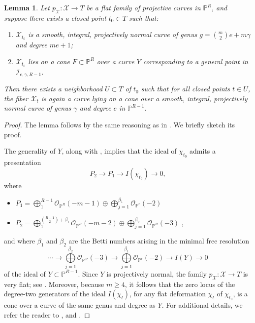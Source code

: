 \documentclass[a4paper,12pt]{amsart}
\newtheorem{lemma}[thm]{Lemma}
\begin{document}
\begin{lemma}\label{Sec5DeformLemma}
Let $p_{\mathcal{X}} : \mathcal{X} \to T$ be a flat family of projective curves in $\mathbb{P}^R$, and suppose there exists a closed point $t_0 \in T$ such that:
\begin{enumerate}[label=(\roman*), leftmargin=*, font=\rmfamily]
 \item  $\mathcal{X}_{t_0}$ is a smooth, integral, projectively normal curve of genus $g = \binom{m}{2}e + m\gamma$ and degree $me + 1$;

 \item $\mathcal{X}_{t_0}$ lies on a cone $F \subset \mathbb{P}^R$ over a curve $Y$ corresponding to a general point in $\mathcal{I}_{e, \gamma, R-1}$.
\end{enumerate}
Then there exists a neighborhood $U \subset T$ of $t_0$ such that for all closed points $t \in U$, the fiber $\mathcal{X}_t$ is again a curve lying on a cone over a smooth, integral, projectively normal curve of genus $\gamma$ and degree $e$ in $\mathbb{P}^{R-1}$.
\end{lemma}
\begin{proof}
The lemma follows by the same reasoning as in \cite[Lemma~8]{CIK24b}. We briefly sketch its proof.

The generality of $Y$, along with \cite[Proposition~2]{CG99}, implies that the ideal of $\chi_{t_0}$ admits a presentation
\begin{equation*}
 P_2 \to P_1 \to I(\chi_{t_0}) \to 0 ,
\end{equation*}
where
\begin{itemize}
 \item $P_1 = \bigoplus\limits^{R-1}_1 \mathcal{O}_{\mathbb{P}^{R}}(-m-1) \oplus \bigoplus\limits^{\beta_1}_{j=1} \mathcal{O}_{\mathbb{P}^{r}} (-2)$

 \item $P_2 = \bigoplus\limits^{\binom{R-1}{2} + \beta_1}_1 \mathcal{O}_{\mathbb{P}^{R}}(-m-2) \oplus \bigoplus\limits^{\beta_2}_{j=1} \mathcal{O}_{\mathbb{P}^{R}} (-3)$ ,
\end{itemize}
and where $\beta_1$ and $\beta_2$ are the Betti numbers arising in the minimal free resolution
\[
 \cdots \to \bigoplus\limits^{\beta_2}_{j=1} \mathcal{O}_{\mathbb{P}^{R}} (-3) \to \bigoplus\limits^{\beta_1}_{j=1} \mathcal{O}_{\mathbb{P}^{r}} (-2) \to I(Y) \to 0
\]
of the ideal of $Y \subset \mathbb{P}^{R-1}$. Since $Y$ is projectively normal, the family $p_{\mathcal{X}} : \mathcal{X} \to T$ is very flat; see \cite[Ex.~III.9.5, p.~266]{Hart77}. Moreover, because $m \geq 4$, it follows that the zero locus of the degree-two generators of the ideal $I(\chi_t)$, for any flat deformation $\chi_{t}$ of $\chi_{t_0}$, is a cone over a curve of the same genus and degree as $Y$. For additional details, we refer the reader to \cite{CIK24b}, \cite{CLM96} and \cite{Cil87}.
\end{proof}
\end{document}
